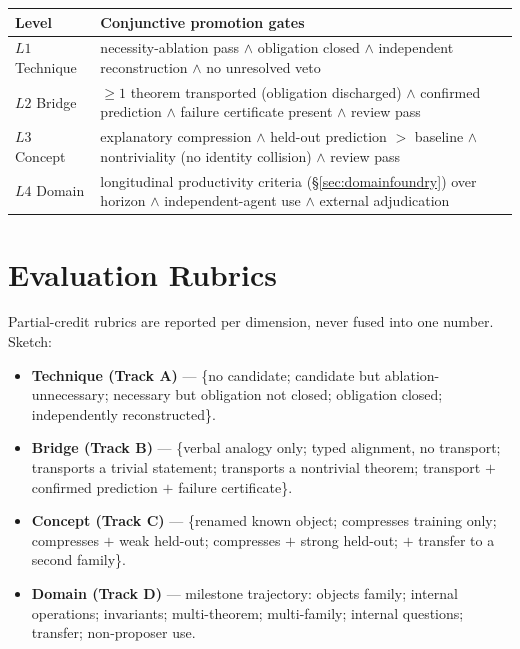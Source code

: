 \documentclass[11pt]{article}
\theoremstyle{definition}
\theoremstyle{remark}
\begin{document}
\begin{table}[h]
\centering
\small
\begin{tabular}{p{} p{}}
\toprule
Level & Conjunctive promotion gates \\
\midrule
$L1$ Technique & necessity-ablation pass $\wedge$ obligation closed $\wedge$ independent reconstruction $\wedge$ no unresolved veto \\
$L2$ Bridge & $\ge 1$ theorem transported (obligation discharged) $\wedge$ confirmed prediction $\wedge$ failure certificate present $\wedge$ review pass \\
$L3$ Concept & explanatory compression $\wedge$ held-out prediction $>$ baseline $\wedge$ nontriviality (no identity collision) $\wedge$ review pass \\
$L4$ Domain & longitudinal productivity criteria (\S\ref{sec:domainfoundry}) over horizon $\wedge$ independent-agent use $\wedge$ external adjudication \\
\bottomrule
\end{tabular}
\end{table}

\section{Evaluation Rubrics}
\label{app:rubrics}

Partial-credit rubrics are reported per dimension, never fused into one number. Sketch:
\begin{itemize}[leftmargin=1.4em,itemsep=1pt]
  \item \textbf{Technique (Track A)} --- \{no candidate; candidate but ablation-unnecessary; necessary
  but obligation not closed; obligation closed; independently reconstructed\}.
  \item \textbf{Bridge (Track B)} --- \{verbal analogy only; typed alignment, no transport; transports
  a trivial statement; transports a nontrivial theorem; transport $+$ confirmed prediction $+$ failure
  certificate\}.
  \item \textbf{Concept (Track C)} --- \{renamed known object; compresses training only; compresses
  $+$ weak held-out; compresses $+$ strong held-out; $+$ transfer to a second family\}.
  \item \textbf{Domain (Track D)} --- milestone trajectory: objects family; internal operations;
  invariants; multi-theorem; multi-family; internal questions; transfer; non-proposer use.
\end{itemize}
\end{document}
